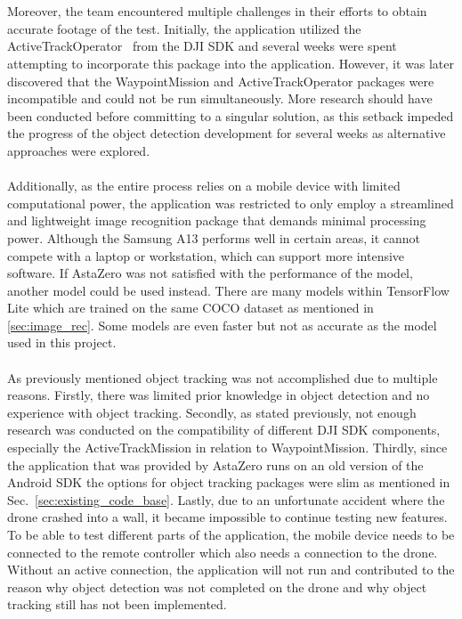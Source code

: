 \\ \\
Moreover, the team encountered multiple challenges in their efforts to obtain accurate footage of the test. Initially, the application utilized the ActiveTrackOperator~\cite{DJIDJIActiveTrackOperator} from the DJI SDK and several weeks were spent attempting to incorporate this package into the application. However, it was later discovered that the WaypointMission and ActiveTrackOperator packages were incompatible and could not be run simultaneously. More research should have been conducted before committing to a singular solution, as this setback impeded the progress of the object detection development for several weeks as alternative approaches were explored.
\\ \\
Additionally, as the entire process relies on a mobile device with limited computational power, the application was restricted to only employ a streamlined and lightweight image recognition package that demands minimal processing power. Although the Samsung A13 performs well in certain areas, it cannot compete with a laptop or workstation, which can support more intensive software. If AstaZero was not satisfied with the performance of the model, another model could be used instead. There are many models within TensorFlow Lite which are trained on the same COCO dataset as mentioned in \ref{sec:image_rec}. Some models are even faster but not as accurate as the model used in this project.
\\ \\
As previously mentioned object tracking was not accomplished due to multiple reasons. Firstly, there was limited prior knowledge in object detection and no experience with object tracking. Secondly, as stated previously, not enough research was conducted on the compatibility of different DJI SDK components, especially the ActiveTrackMission in relation to WaypointMission. Thirdly, since the application that was provided by AstaZero runs on an old version of the Android SDK the options for object tracking packages were slim as mentioned in Sec.~\ref{sec:existing_code_base}. Lastly, due to an unfortunate accident where the drone crashed into a wall, it became impossible to continue testing new features. To be able to test different parts of the application, the mobile device needs to be connected to the remote controller which also needs a connection to the drone. Without an active connection, the application will not run and contributed to the reason why object detection was not completed on the drone and why object tracking still has not been implemented.
